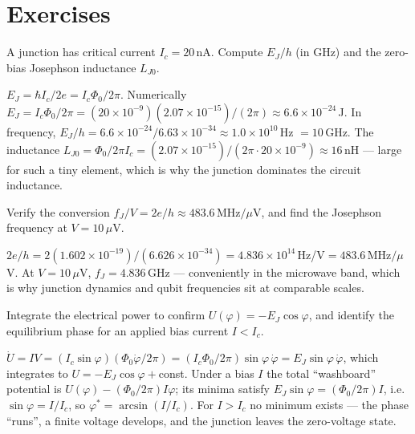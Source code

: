 \section*{Exercises}

\begin{exercise}
A junction has critical current $I_c=20\,$nA. Compute $E_J/h$ (in GHz)
and the zero-bias Josephson inductance $L_{J0}$.
\begin{solution}
$E_J=\hbar I_c/2e=I_c\Phi_0/2\pi$. Numerically
$E_J=I_c\Phi_0/2\pi=(20\times10^{-9})(2.07\times10^{-15})/(2\pi)
\approx6.6\times10^{-24}\,$J. In frequency,
$E_J/h=6.6\times10^{-24}/6.63\times10^{-34}\approx1.0\times10^{10}\,$Hz
$=10\,$GHz. The inductance
$L_{J0}=\Phi_0/2\pi I_c=(2.07\times10^{-15})/(2\pi\cdot20\times10^{-9})
\approx16\,$nH --- large for such a tiny element, which is why the
junction dominates the circuit inductance.
\end{solution}
\end{exercise}

\begin{exercise}
Verify the conversion $f_J/V=2e/h\approx483.6\,$MHz$/\mu$V, and find
the Josephson frequency at $V=10\,\mu$V.
\begin{solution}
$2e/h=2(1.602\times10^{-19})/(6.626\times10^{-34})
=4.836\times10^{14}\,$Hz/V$=483.6\,$MHz$/\mu$V. At $V=10\,\mu$V,
$f_J=4.836\,$GHz --- conveniently in the microwave band, which is why
junction dynamics and qubit frequencies sit at comparable scales.
\end{solution}
\end{exercise}

\begin{exercise}
Integrate the electrical power to confirm $U(\varphi)=-E_J\cos\varphi$,
and identify the equilibrium phase for an applied bias current
$I<I_c$.
\begin{solution}
$\dot U=IV=(I_c\sin\varphi)(\Phi_0\dot\varphi/2\pi)
=(I_c\Phi_0/2\pi)\sin\varphi\,\dot\varphi=E_J\sin\varphi\,\dot\varphi$,
which integrates to $U=-E_J\cos\varphi+$const. Under a bias $I$ the
total ``washboard'' potential is $U(\varphi)-(\Phi_0/2\pi)I\varphi$;
its minima satisfy $E_J\sin\varphi=(\Phi_0/2\pi)I$, i.e.\
$\sin\varphi=I/I_c$, so $\varphi^*=\arcsin(I/I_c)$. For $I>I_c$ no
minimum exists --- the phase ``runs'', a finite voltage develops, and
the junction leaves the zero-voltage state.
\end{solution}
\end{exercise}

